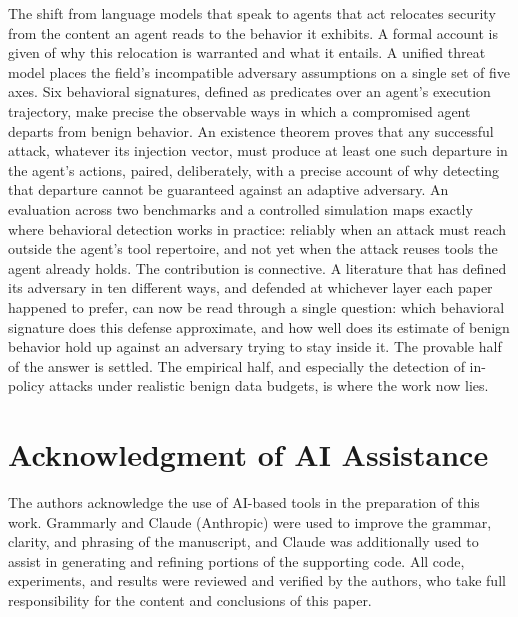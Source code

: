 \documentclass[journal]{IEEEtran}
\theoremstyle{remark}
\begin{document}
The shift from language models that speak to agents that act relocates security from the content an agent reads to the behavior it exhibits. A formal account is given of why this relocation is warranted and what it entails. A unified threat model places the field's incompatible adversary assumptions on a single set of five axes. Six behavioral signatures, defined as predicates over an agent's execution trajectory, make precise the observable ways in which a compromised agent departs from benign behavior. An existence theorem proves that any successful attack, whatever its injection vector, must produce at least one such departure in the agent's actions, paired, deliberately, with a precise account of why detecting that departure cannot be guaranteed against an adaptive adversary. An evaluation across two benchmarks and a controlled simulation maps exactly where behavioral detection works in practice: reliably when an attack must reach outside the agent's tool repertoire, and not yet when the attack reuses tools the agent already holds. The contribution is connective. A literature that has defined its adversary in ten different ways, and defended at whichever layer each paper happened to prefer, can now be read through a single question: which behavioral signature does this defense approximate, and how well does its estimate of benign behavior hold up against an adversary trying to stay inside it. The provable half of the answer is settled. The empirical half, and especially the detection of in-policy attacks under realistic benign data budgets, is where the work now lies.

\section*{Acknowledgment of AI Assistance}
The authors acknowledge the use of AI-based tools in the preparation of this work. Grammarly and Claude (Anthropic) were used to improve the grammar, clarity, and phrasing of the manuscript, and Claude was additionally used to assist in generating and refining portions of the supporting code. All code, experiments, and results were reviewed and verified by the authors, who take full responsibility for the content and conclusions of this paper.
\end{document}

